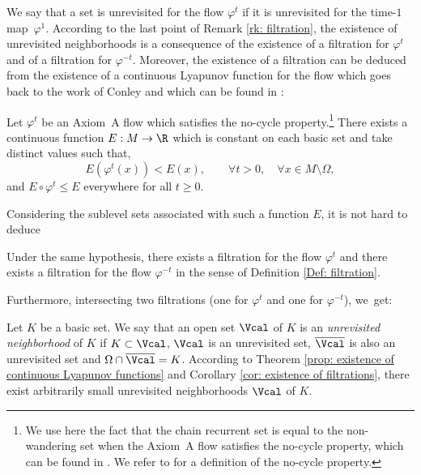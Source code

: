 We say that a set is unrevisited for the flow $\varphi^t$ if it is unrevisited for the time\nobreakdash-$1$ map~$\varphi^1$. According to the last point of Remark \ref{rk: filtration}, the existence of unrevisited neighborhoods is a consequence of the existence of a filtration for $\varphi^t$ and of a filtration for $\varphi^{-t}$. Moreover, the existence of a filtration can be deduced from the existence of a continuous Lyapunov function for the flow which goes back to the work of Conley \cite[p.\,20]{conley} and which can be found in \cite[Th.\,1.5.44 \& 5.3.47]{FH}:

\begin{thm}\label{prop: existence of continuous Lyapunov functions}
Let $\varphi^t$ be an Axiom~A flow which satisfies the no-cycle property.\footnote{We use here the fact that the chain recurrent set is equal to the non-wandering set when the Axiom~A flow satisfies the no-cycle property, which can be found in \cite[Th.\,5.3.47]{FH}. We refer to \cite[Def.\,5.3.42]{FH} for a definition of the no-cycle property.} There exists a continuous function $E: M \to \R$ which is constant on each basic set and take distinct values such that,
\[
E \left(\varphi^t (x) \right) < E (x), \qquad \forall t > 0, \quad \forall x \in M \setminus \Omega,
\]
and $E \circ \varphi^t \leq E$ everywhere for all $t \geq 0$.
\end{thm}

Considering the sublevel sets associated with such a function $E$, it is not hard to deduce

\begin{corollary}\label{cor: existence of filtrations} Under the same hypothesis, there exists a filtration for the flow $\varphi^t$ and there exists a filtration for the flow $\varphi^{-t}$ in the sense of Definition \ref{Def: filtration}.
\end{corollary}

Furthermore, intersecting two filtrations (one for $\varphi^t$ and one for $\varphi^{-t}$), we~get:

\begin{corollary}\label{prop: Robbin existence of unrevisited neighborhoods}Let $K$ be a basic set. We say that an open set $\Vcal$ of $K$ is an \emph{unrevisited neighborhood} of $K$ if $K \subset \Vcal$, $\Vcal$ is an unrevisited set, $\overline{\Vcal}$ is also an unrevisited set and $\Omega \cap \overline{\Vcal} = K$.
According to Theorem \ref{prop: existence of continuous Lyapunov functions} and Corollary \ref{cor: existence of filtrations}, there exist arbitrarily small unrevisited neighborhoods $\Vcal$ of $K$.
\end{corollary}


